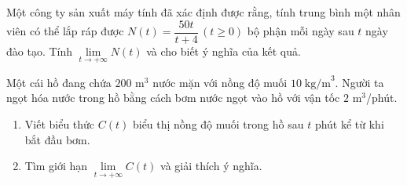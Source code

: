 \begin{vd}%
	Một công ty sản xuất máy tính đã xác định được rằng, tính trung bình một nhân viên có thể lắp ráp được $N(t)=\dfrac{50 t}{t+4}\, (t \geq 0)$ bộ phận mỗi ngày sau $t$ ngày đào tạo. Tính $\lim\limits_{t \to+\infty} N(t)$ và cho biết ý nghĩa của kết quả.
\end{vd}

\begin{vd}%
	Một cái hồ đang chứa $ 200 $ m$^3$ nước mặn với nồng độ muối $ 10 \mathrm{\;kg/m}^3$. Người ta ngọt hóa nước trong hồ bằng cách bơm nước ngọt vào hồ với vận tốc $ 2 $ m$^3$/phút.
	\begin{enumerate}
		\item Viết biểu thức $ C(t) $ biểu thị nồng độ muối trong hồ sau $ t $ phút kể từ khi bắt đầu bơm.
		\item Tìm giới hạn $ \lim \limits_{t \to +\infty} C(t) $ và giải thích ý nghĩa.
	\end{enumerate}
\end{vd}


